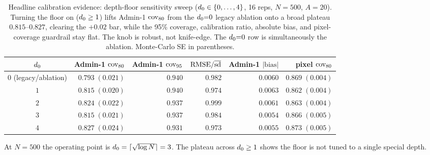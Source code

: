 \begin{table}[t]
\centering
\small
\caption{Headline calibration evidence: depth-floor sensitivity sweep
($d_0\in\{0,\dots,4\}$, 16 reps, $N=500$, $A=20$). Turning the floor on
($d_0\ge1$) lifts Admin-1 $\mathrm{cov}_{80}$ from the $d_0{=}0$ legacy ablation onto a
broad plateau $0.815$--$0.827$, clearing the $+0.02$ bar, while the 95\% coverage,
calibration ratio, absolute bias, and pixel-coverage guardrail stay flat. The knob
is robust, not knife-edge. The $d_0{=}0$ row is simultaneously the ablation.
Monte-Carlo SE in parentheses.}
\label{tab:d0sweep}
\begin{tabular}{c rr r r r}
\toprule
$d_0$ & Admin-1 $\mathrm{cov}_{80}$ & Admin-1 $\mathrm{cov}_{95}$ & $\mathrm{RMSE}/\overline{\mathrm{sd}}$ & Admin-1 $|\mathrm{bias}|$ & pixel $\mathrm{cov}_{80}$ \\
\midrule
$0$ (legacy/ablation) & $0.793\;(0.021)$ & $0.940$ & $0.982$ & $0.0060$ & $0.869\;(0.004)$ \\
$1$ & $0.815\;(0.020)$ & $0.940$ & $0.974$ & $0.0063$ & $0.862\;(0.004)$ \\
$2$ & $0.824\;(0.022)$ & $0.937$ & $0.999$ & $0.0061$ & $0.863\;(0.004)$ \\
$3$ & $0.815\;(0.021)$ & $0.937$ & $0.984$ & $0.0054$ & $0.866\;(0.005)$ \\
$4$ & $0.827\;(0.024)$ & $0.931$ & $0.973$ & $0.0055$ & $0.873\;(0.005)$ \\
\bottomrule
\end{tabular}

\vspace{2pt}
{\footnotesize At $N=500$ the operating point is $d_0=\lceil\sqrt{\log N}\rceil=3$.
The plateau across $d_0\ge1$ shows the floor is not tuned to a single special depth.}
\end{table}
